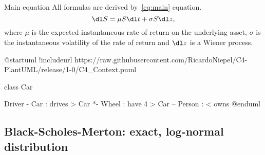 \begin{frame}[t]{\secname}
	\begin{block}{Main equation}
		All formulas are derived by~\eqref{eq:main} equation.
		\begin{equation}\label{eq:main}
			\dl S=\mu S \dl t+\sigma S \dl z,
		\end{equation}
		where $\mu$ is the expected instantaneous rate of return on the underlying asset, $\sigma$ is the instantaneous volatility of the rate of return and $\dl z$ is a Wiener process.
	\end{block}
\end{frame}


\begin{frame}[fragile]


\end{frame}

\begin{frame}[fragile]%
\begin{plantuml}
@startuml
!includeurl https://raw.githubusercontent.com/RicardoNiepel/C4-PlantUML/release/1-0/C4_Context.puml

class Car

Driver - Car : drives >
Car *- Wheel : have 4 >
Car -- Person : < owns
@enduml
\end{plantuml}
\end{frame}

\subsection{\alert{Black-Scholes-Merton}: exact, log-normal distribution}

